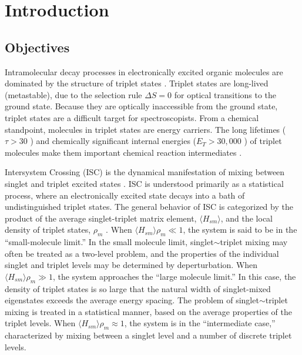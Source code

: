 % 

\chapter{Introduction}
\label{chapter:intro}

\section{Objectives}

Intramolecular decay processes in electronically excited organic
molecules are dominated by the structure of triplet states
\cite{mcglynn69, medvedev95}.  Triplet states are long-lived
(metastable), due to the selection rule $\Delta S = 0$ for optical
transitions to the ground state.  Because they are optically
inaccessible from the ground state, triplet states are a difficult
target for spectroscopists.  From a chemical standpoint, molecules in
triplet states are energy carriers.  The long lifetimes ($\tau > 30$
\microsec) and chemically significant internal energies ($E_T >
30,000$ \rcm) of triplet molecules make them important chemical
reaction intermediates \cite{calvert66}.

Intersystem Crossing (ISC) is the dynamical manifestation of mixing
between singlet and triplet excited states \cite{robinson67,
  kommandeur87, lombardi88, tramer05}.  ISC is understood primarily as
a statistical process, where an electronically excited state decays
into a bath of undistinguished triplet states.  The general behavior
of ISC is categorized by the product of the average singlet-triplet
matrix element, $\langle H_{sm} \rangle$, and the local density of
triplet states, $\rho_m$ \cite{robinson67, kommandeur87, freed76}.  When
$\langle H_{sm} \rangle \rho_m \ll 1$, the system is said to be in the
``small-molecule limit.''  In the small molecule limit,
singlet$\sim$triplet mixing may often be treated as a two-level
problem, and the properties of the individual singlet and triplet
levels may be determined by deperturbation.  When $\langle H_{sm}
\rangle \rho_m \gg 1$, the system approaches the ``large molecule
limit.''  In this case, the density of triplet states is so large that
the natural width of singlet-mixed eigenstates exceeds the average
energy spacing.  The problem of singlet$\sim$triplet mixing is treated
in a statistical manner, based on the average properties of the
triplet levels.  When $\langle H_{sm} \rangle \rho_m \approx 1$, the
system is in the ``intermediate case,'' characterized by mixing
between a singlet level and a number of discrete triplet levels.

